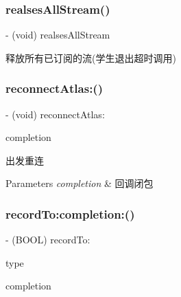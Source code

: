 \subsubsection{\texorpdfstring{realses\+All\+Stream()}{realsesAllStream()}}
{\footnotesize\ttfamily -\/ (void) realses\+All\+Stream \begin{DoxyParamCaption}{ }\end{DoxyParamCaption}}

释放所有已订阅的流(学生退出超时调用) \mbox{\label{interface_c_c_streamer_basic_a67b341f9bc16e13c97c41543078d33f5}} 
\subsubsection{\texorpdfstring{reconnect\+Atlas\+:()}{reconnectAtlas:()}}
{\footnotesize\ttfamily -\/ (void) reconnect\+Atlas\+: \begin{DoxyParamCaption}\item[{(C\+C\+Comletion\+Block)}]{completion }\end{DoxyParamCaption}}

出发重连 
\begin{DoxyParams}{Parameters}
{\em completion} & 回调闭包 \\
\hline
\end{DoxyParams}
\mbox{\label{interface_c_c_streamer_basic_aae5fa8e92538f309f2eac0d0bd194d2f}} 
\subsubsection{\texorpdfstring{record\+To\+:completion\+:()}{recordTo:completion:()}}
{\footnotesize\ttfamily -\/ (B\+O\+OL) record\+To\+: \begin{DoxyParamCaption}\item[{(C\+C\+Record\+Type)}]{type }\item[{completion:(C\+C\+Comletion\+Block)}]{completion }\end{DoxyParamCaption}}

